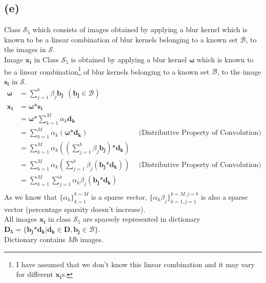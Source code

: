 \documentclass[fleqn, 11pt]{article}
\begin{document}
\subsection*{(e)}
Class $\mathcal{S}_5$ which consists of images obtained by applying a blur kernel which is known to be a linear combination of blur kernels belonging to a known set $\mathcal{B}$, to the images in $\mathcal{S}$. \\
Image $\boldsymbol{x_i}$ in Class $\mathcal{S}_5$ is obtained by applying a blur kernel $\boldsymbol{\omega}$ which is known to be a linear combination\footnote{I have assumed that we don't know this linear combination and it may vary for different $\boldsymbol{x_i}$s.} of blur kernels belonging to a known set $\mathcal{B}$, to the image $\boldsymbol{s_i}$ in $\mathcal{S}$. \\
\begin{equation*}
    \begin{aligned}
        \boldsymbol{\omega} &= \sum_{j=1}^{b} \beta_j \boldsymbol{b_j} \ \  (\boldsymbol{b_j} \in \mathcal{B}) \\
        \boldsymbol{x_i} &= \boldsymbol{\omega} \boldsymbol{*} \boldsymbol{s_i} \\
            &= \boldsymbol{\omega} \boldsymbol{*} \sum_{k=1}^{M} \alpha_k \boldsymbol{d_k} \\
            &= \sum_{k=1}^{M} \alpha_k (\boldsymbol{\omega} \boldsymbol{*} \boldsymbol{d_k}) &\ \ (\text{Distributive Property of Convolution)}\\
            &= \sum_{k=1}^{M} \alpha_k ((\sum_{j=1}^{b} \beta_j \boldsymbol{b_j}) \boldsymbol{*} \boldsymbol{d_k}) \\
            &= \sum_{k=1}^{M} \alpha_k (\sum_{j=1}^{b} \beta_j (\boldsymbol{b_j} \boldsymbol{*} \boldsymbol{d_k})) &\ \ (\text{Distributive Property of Convolution)}\\
            &= \sum_{k=1}^{M} \sum_{j=1}^{b} \alpha_k \beta_j (\boldsymbol{b_j} \boldsymbol{*} \boldsymbol{d_k}) \\
    \end{aligned}
\end{equation*}
As we know that $\{\alpha_k\}_{k=1}^{k=M}$ is a sparse vector, $\{\alpha_k \beta_j\}_{k=1, j=1}^{k=M, j=b}$ is also a sparse vector (percentage sparsity doesn't increase). \\
All images $\boldsymbol{x_i}$ in class $\mathcal{S}_5$ are sparsely represented in dictionary $\boldsymbol{D_5} = \{\boldsymbol{b_j} \boldsymbol{*} \boldsymbol{d_k} | \boldsymbol{d_k} \in \boldsymbol{D}, \boldsymbol{b_j} \in \mathcal{B} \}$. \\ Dictionary contains $Mb$ images.
\end{document}
